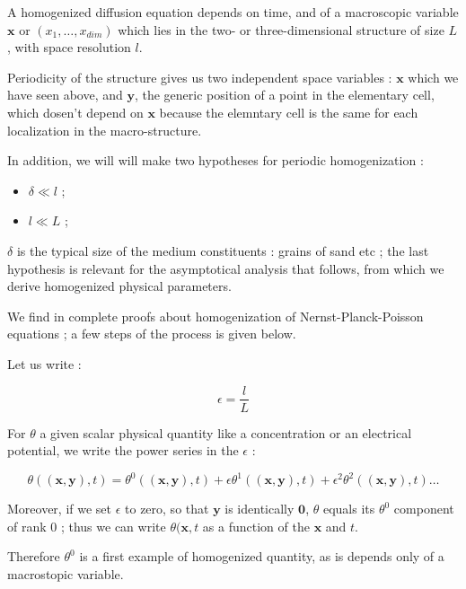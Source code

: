 \par
A homogenized diffusion equation depends on time, and of a macroscopic variable $\mathbf{x}$ or $(x_1,\dots ,x_{dim})$ which lies in the two- or three-dimensional structure of size $L$, %
with space resolution $l$.

\par
Periodicity of the structure gives us two independent space variables : %
$\mathbf{x}$ which we have seen above, %
and $\mathbf{y}$, the generic position of a point in the elementary cell, which dosen't depend on $\mathbf{x}$ because the elemntary cell is the same for each localization in the macro-structure.

\par
In addition, we will will make two hypotheses for periodic homogenization :

\begin{itemize}
\item $\delta\ll l$ ;
\item $l\ll L$ ;
\end{itemize}

$\delta$ is the typical size of the medium constituents : grains of sand etc ; %
the last hypothesis is relevant for the asymptotical analysis that follows, %
from which we derive homogenized physical parameters.

\ligneinter
We find in \cite{th_khaledB} complete proofs about homogenization of Nernst-Planck-Poisson equations ; %
a few steps of the process is given below.

\par
Let us write :

\[\epsilon =\frac{l}{L}\]

For $\theta$ a given scalar physical quantity like a concentration or an electrical potential, we write the power series in the $\epsilon$ :

\begin{equation}\label{asyt}
\theta\left((\mathbf{x},\mathbf{y}),t\right)=\theta^0\left((\mathbf{x},\mathbf{y}),t\right)+\epsilon \theta^1\left((\mathbf{x},\mathbf{y}),t\right) +\epsilon^2 \theta^2\left((\mathbf{x},\mathbf{y}),t\right) \dots
\end{equation}

Moreover, if we set $\epsilon$ to zero, so that $\mathbf{y}$ is identically $\mathbf{0}$, %
$\theta$ equals its $\theta^0$ component of rank $0$ ; %
thus we can write $\theta(\mathbf{x},t$ as a function of the $\mathbf{x}$ and $t$.

\par
Therefore $\theta^0$ is a first example of homogenized quantity, as is depends only of a macrostopic variable.


